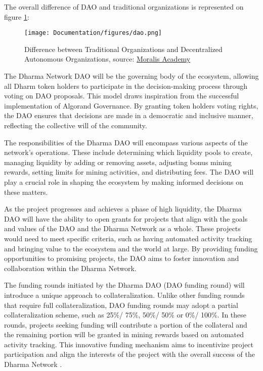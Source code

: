 The overall difference of DAO and traditional organizations is represented on figure \ref{fig:dao}:

    \begin{figure}[htbp]
	   \centering
	   \texttt{[image: Documentation/figures/dao.png]}  %
	   \caption{Difference between Traditional Organizations and Decentralized Autonomous Organizations, source: \href{https://academy.moralis.io/blockchain-guides/beginners-guide-how-to-create-a-dao}{Moralis Academy}}
	   \label{fig:dao}
    \end{figure}

The Dharma Network DAO will be the governing body of the ecosystem, allowing all Dharm token holders to participate in the decision-making process through voting on DAO proposals. This model draws inspiration from the successful implementation of Algorand Governance. By granting token holders voting rights, the DAO ensures that decisions are made in a democratic and inclusive manner, reflecting the collective will of the community.\newline

The responsibilities of the Dharma DAO will encompass various aspects of the network's operations. These include determining which liquidity pools to create, managing liquidity by adding or removing assets, adjusting bonus mining rewards, setting limits for mining activities, and distributing fees. The DAO will play a crucial role in shaping the ecosystem by making informed decisions on these matters.\newline

As the project progresses and achieves a phase of high liquidity, the Dharma DAO will have the ability to open grants for projects that align with the goals and values of the DAO and the Dharma Network as a whole. These projects would need to meet specific criteria, such as having automated activity tracking and bringing value to the ecosystem and the world at large. By providing funding opportunities to promising projects, the DAO aims to foster innovation and collaboration within the Dharma Network.\newline

The funding rounds initiated by the Dharma DAO (DAO funding round) will introduce a unique approach to collateralization. Unlike other funding rounds that require full collateralization, DAO funding rounds may adopt a partial collateralization scheme, such as 25\%/ 75\%, 50\%/ 50\% or 0\%/ 100\%. In these rounds, projects seeking funding will contribute a portion of the collateral and the remaining portion will be granted in mining rewards based on automated activity tracking. This innovative funding mechanism aims to incentivize project participation and align the interests of the project with the overall success of the Dharma Network \cite{dharma}.\newline

